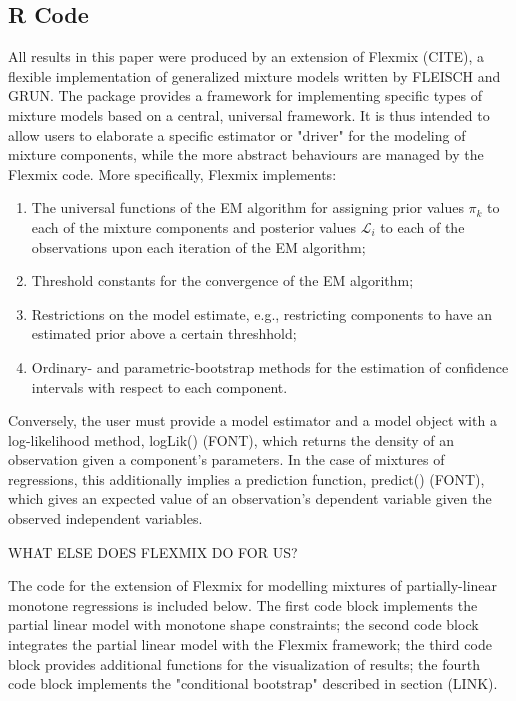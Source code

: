 \documentclass[fleqn,10pt]{olplainarticle}\usepackage[]{graphicx}\usepackage[]{color}
\begin{document}
\begin{appendices}
\chapter{R Code}


All results in this paper were produced by an extension of Flexmix (CITE), a flexible implementation of generalized mixture models written by FLEISCH and GRUN. The package provides a framework for implementing specific types of mixture models based on a central, universal framework. It is thus intended to allow users to elaborate a specific estimator or "driver" for the modeling of mixture components, while the more abstract behaviours are managed by the Flexmix code. More specifically, Flexmix implements:

\begin{enumerate}
  \item The universal functions of the EM algorithm for assigning prior values $\pi_k$ to each of the mixture components and posterior values $\mathcal{L}_i$ to each of the observations upon each iteration of the EM algorithm;
  \item Threshold constants for the convergence of the EM algorithm;
  \item Restrictions on the model estimate, e.g., restricting components to have an estimated prior above a certain threshhold;
  \item Ordinary- and parametric-bootstrap methods for the estimation of confidence intervals with respect to each component.
\end{enumerate}

Conversely, the user must provide a model estimator and a model object with a log-likelihood method, logLik() (FONT), which returns the density of an observation given a component's parameters. In the case of mixtures of regressions, this additionally implies a prediction function, predict() (FONT), which gives an expected value of an observation's dependent variable given the observed independent variables.

WHAT ELSE DOES FLEXMIX DO FOR US?

The code for the extension of Flexmix for modelling mixtures of partially-linear monotone regressions is included below. The first code block implements the partial linear model with monotone shape constraints; the second code block integrates the partial linear model with the Flexmix framework; the third code block provides additional functions for the visualization of results; the fourth code block implements the "conditional bootstrap" described in section (LINK).



\end{appendices}
\end{document}
